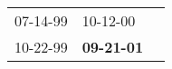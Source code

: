 \begin{supertabular}{p{0.33\columnwidth}p{0.33\columnwidth}p{0.33\columnwidth}}
 07-14-99\textsuperscript{} &           10-12-00\textsuperscript{} \\
 10-22-99\textsuperscript{} &  \textbf{09-21-01\textsuperscript{}} \\
\end{supertabular}
